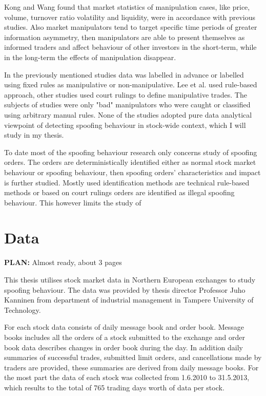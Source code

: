 \documentclass{tut-thesis}
\begin{document}
Kong and Wang \parencite*{KongWang2014} found that market statistics of manipulation cases, like price, volume, turnover ratio volatility and liquidity, were in accordance with previous studies. Also market manipulators tend to target specific time periods of greater information asymmetry, then manipulators are able to present themselves as informed traders and affect behaviour of other investors in the short-term, while in the long-term the effects of manipulation disappear. \autocite{KongWang2014}


In the previously mentioned studies data was labelled in advance or labelled using fixed rules as manipulative or non-manipulative. Lee et al. used rule-based approach, other studies used court rulings to define manipulative trades. The subjects of studies were only "bad" manipulators who were caught or classified using arbitrary manual rules. None of the studies adopted pure data analytical viewpoint of detecting spoofing behaviour in stock-wide context, which I will study in my thesis.

To date most of the spoofing behaviour research only concerns study of spoofing orders. The orders are deterministically identified either as normal stock market behaviour or spoofing behaviour, then spoofing orders' characteristics and impact is further studied. Mostly used identification methods are technical rule-based methods or based on court rulings orders are identified as illegal spoofing behaviour. This however limits the study of  


\section{Data}
\textbf{PLAN:} Almost ready, about 3 pages

This thesis utilises stock market data in Northern European exchanges to study spoofing behaviour. The data was provided by thesis director Professor Juho Kanninen from department of industrial management in Tampere University of Technology. 

For each stock data consists of daily message book and order book. Message books includes all the orders of a stock submitted to the exchange and order book data describes changes in order book during the day. In addition daily summaries of successful trades, submitted limit orders, and cancellations made by traders are provided, these summaries are derived from daily message books. For the most part the data of each stock was collected from 1.6.2010 to 31.5.2013, which results to the total of 765 trading days worth of data per stock. 
\end{document}
